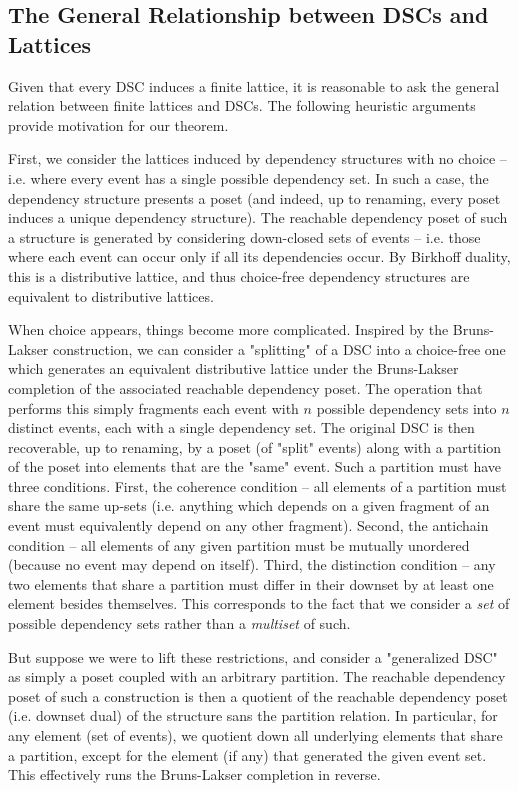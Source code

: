 \documentclass[hoptionsi,review,format=acmsmall]{acmart}
\theoremstyle{definition}
\begin{document}
\subsection{The General Relationship between DSCs and Lattices}
Given that every DSC induces a finite lattice, it is reasonable to ask the general relation between finite lattices and DSCs. The following heuristic arguments provide motivation for our theorem. 

First, we consider the lattices induced by dependency structures with no choice -- i.e. where every event has a single possible dependency set. In such a case, the dependency structure presents a poset (and indeed, up to renaming, every poset induces a unique dependency structure). The reachable dependency poset of such a structure is generated by considering down-closed sets of events -- i.e. those where each event can occur only if all its dependencies occur. By Birkhoff duality, this is a distributive lattice, and thus choice-free dependency structures are equivalent to distributive lattices.

When choice appears, things become more complicated. Inspired by the Bruns-Lakser construction, we can consider a "splitting" of a DSC into a choice-free one which generates an equivalent distributive lattice under the Bruns-Lakser completion of the associated reachable dependency poset. The operation that performs this simply fragments each event with \(n\) possible dependency sets into \(n\) distinct events, each with a single dependency set. The original DSC is then recoverable, up to renaming, by a poset (of "split" events) along with a partition of the poset into elements that are the "same" event. Such a partition must have three conditions. First, the coherence condition -- all elements of a partition must share the same up-sets (i.e. anything which depends on a given fragment of an event must equivalently depend on any other fragment). Second, the antichain condition -- all elements of any given partition must be mutually unordered (because no event may depend on itself). Third, the distinction condition -- any two elements that share a partition must differ in their downset by at least one element besides themselves. This corresponds to the fact that we consider a \textit{set} of possible dependency sets rather than a \textit{multiset} of such. 

But suppose we were to lift these restrictions, and consider a "generalized DSC" as simply a poset coupled with an arbitrary partition. The reachable dependency poset of such a construction is then a quotient of the reachable dependency poset (i.e. downset dual) of the structure sans the partition relation. In particular, for any element (set of events), we quotient down all underlying elements that share a partition, except for the element (if any) that generated the given event set. This effectively runs the Bruns-Lakser completion in reverse. 
\end{document}

